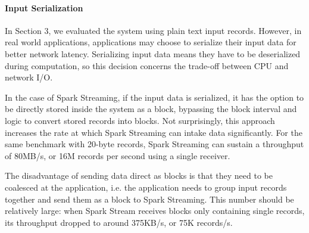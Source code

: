 \paragraph{Input Serialization}
In Section 3, we evaluated the system using plain text input records. However, in real world applications, applications may choose to serialize their input data for better network latency. Serializing input data means they have to be deserialized during computation, so this decision concerns the trade-off between CPU and network I/O.

In the case of Spark Streaming, if the input data is serialized, it has the option to be directly stored inside the system as a block, bypassing the block interval and logic to convert stored records into blocks. Not surprisingly, this approach increases the rate at which Spark Streaming can intake data significantly. For the same benchmark with 20-byte records, Spark Streaming can sustain a throughput of 80MB/s, or 16M records per second using a single receiver.

The disadvantage of sending data direct as blocks is that they need to be coalesced at the application, i.e. the application needs to group input records together and send them as a block to Spark Streaming. This number should be relatively large: when Spark Stream receives blocks only containing single records, its throughput dropped to around 375KB/s, or 75K records/s.



